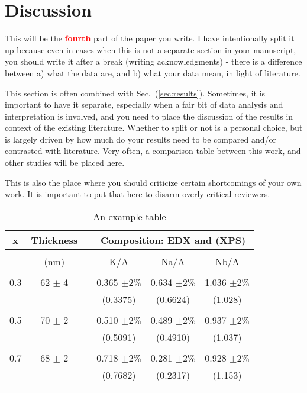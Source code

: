 \documentclass[12 pt]{article}
\begin{document}
\section{Discussion}
\label{sec:discussion}

This will be the \textbf{\Huge \textcolor{red}{fourth}} part of the paper you write. I have intentionally split it up because even in cases when this is not a separate section in your manuscript, you should write it after a break (writing acknowledgments) - there is a difference between a) what the data are, and b) what your data mean, in light of literature.

This section is often combined with Sec.~(\ref{sec:results}). Sometimes, it is important to have it separate, especially when a fair bit of data analysis and interpretation is involved, and you need to place the discussion of the results in context of the existing literature. Whether to split or not is a personal choice, but is largely driven by how much do your results need to be compared and/or contrasted with literature. Very often, a comparison table between this work, and other studies will be placed here.

This is also the place where you should criticize certain shortcomings of your own work. It is important to put that here to disarm overly critical reviewers.

\begin{table}
  \caption{An example table}
  \label{tbl:ratio}
  \begin{center}
    \begin{tabular}{cccccc}
      x  & Thickness & & \multicolumn{3}{c}{Composition: EDX and (XPS)} \\
      \hline \\
         & (nm) & & K/A & Na/A & Nb/A \\
      \hline \\
      0.3 & 62 $\pm$ 4 & & 0.365 $\pm 2\%$ & 0.634 $\pm 2\%$ & 1.036 $\pm 2\%$ \\
         & & & (0.3375) & (0.6624) & (1.028) \\
      \hline \\
      0.5 & 70 $\pm$ 2 & & 0.510 $\pm 2\%$ & 0.489 $\pm 2\%$ & 0.937 $\pm 2\%$ \\
         & & & (0.5091) & (0.4910) & (1.037) \\
      \hline \\
      0.7 & 68 $\pm$ 2 & & 0.718 $\pm 2\%$ & 0.281 $\pm 2\%$ & 0.928 $\pm 2\%$ \\
         & & & (0.7682) & (0.2317) & (1.153) \\
      \hline \\
    \end{tabular}
  \end{center}
\end{table}
\end{document}
